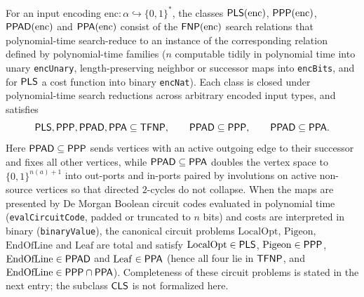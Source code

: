 \begin{result}
For an input encoding $\mathrm{enc}:\alpha\hookrightarrow\{0,1\}^*$, the
classes $\mathsf{PLS}(\mathrm{enc})$, $\mathsf{PPP}(\mathrm{enc})$,
$\mathsf{PPAD}(\mathrm{enc})$ and $\mathsf{PPA}(\mathrm{enc})$ consist of the
$\mathsf{FNP}(\mathrm{enc})$ search relations that polynomial-time search-reduce to
an instance of the corresponding relation defined by polynomial-time families
($n$ computable tidily in polynomial time into unary \texttt{encUnary},
length-preserving neighbor or successor maps into \texttt{encBits}, and for
$\mathsf{PLS}$ a cost function into binary \texttt{encNat}). Each class is closed
under polynomial-time search reductions across arbitrary encoded input types,
and satisfies
\[
\mathsf{PLS},\mathsf{PPP},\mathsf{PPAD},\mathsf{PPA}\subseteq\mathsf{TFNP},\qquad
\mathsf{PPAD}\subseteq\mathsf{PPP},\qquad
\mathsf{PPAD}\subseteq\mathsf{PPA}.
\]
Here $\mathsf{PPAD}\subseteq\mathsf{PPP}$ sends vertices with an active outgoing edge
to their successor and fixes all other vertices, while
$\mathsf{PPAD}\subseteq\mathsf{PPA}$ doubles the vertex space to $\{0,1\}^{n(a)+1}$
into out-ports and in-ports paired by involutions on active non-source vertices
so that directed $2$-cycles do not collapse. When the maps are presented by De
Morgan Boolean circuit codes
evaluated in polynomial time (\texttt{evalCircuitCode}, padded or truncated to
$n$ bits) and costs are interpreted in binary (\texttt{binaryValue}), the
canonical circuit problems $\mathrm{LocalOpt}$, $\mathrm{Pigeon}$,
$\mathrm{EndOfLine}$ and $\mathrm{Leaf}$ are total and satisfy
$\mathrm{LocalOpt}\in\mathsf{PLS}$, $\mathrm{Pigeon}\in\mathsf{PPP}$,
$\mathrm{EndOfLine}\in\mathsf{PPAD}$ and $\mathrm{Leaf}\in\mathsf{PPA}$ (hence all four
lie in $\mathsf{TFNP}$, and $\mathrm{EndOfLine}\in\mathsf{PPP}\cap\mathsf{PPA}$).
Completeness of these circuit problems is stated in the next entry; the subclass
$\mathsf{CLS}$ is not formalized here.\citep{JohnsonPapadimitriouYannakakis1988,MegiddoPapadimitriou1991,Papadimitriou1994PPAD,BeameEtAl1998}

\end{result}
